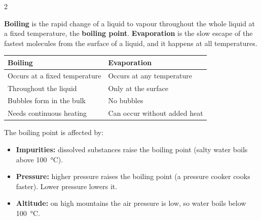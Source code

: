 \documentclass[10pt]{article}
\begin{document}
\begin{multicols}{2}
\begin{definition}
\textbf{Boiling} is the rapid change of a liquid to vapour throughout
the whole liquid at a fixed temperature, the \textbf{boiling point}.
\textbf{Evaporation} is the slow escape of the fastest molecules from
the surface of a liquid, and it happens at all temperatures.
\end{definition}

\begin{center}
\small
\begin{tabular}{@{}p{3.2cm}p{3.2cm}@{}}
\hline
\textbf{Boiling} & \textbf{Evaporation} \\
\hline
Occurs at a fixed temperature & Occurs at any temperature \\
Throughout the liquid & Only at the surface \\
Bubbles form in the bulk & No bubbles \\
Needs continuous heating & Can occur without added heat \\
\hline
\end{tabular}
\end{center}

The boiling point is affected by:
\begin{itemize}[leftmargin=*,nosep]
  \item \textbf{Impurities:} dissolved substances raise the boiling
        point (salty water boils above \SI{100}{\degreeCelsius}).
  \item \textbf{Pressure:} higher pressure raises the boiling point
        (a pressure cooker cooks faster). Lower pressure lowers it.
  \item \textbf{Altitude:} on high mountains the air pressure is low,
        so water boils below \SI{100}{\degreeCelsius}.
\end{itemize}


\end{multicols}
\end{document}
